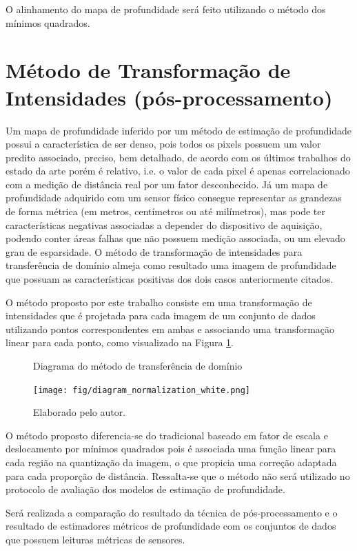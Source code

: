 O alinhamento do mapa de profundidade será feito utilizando o método dos mínimos quadrados.


\section{Método de Transformação de Intensidades (pós-processamento)}

Um mapa de profundidade inferido por um método de estimação de profundidade possui a característica de ser denso, pois todos os pixels possuem um valor predito associado, preciso, bem detalhado, de acordo com os últimos trabalhos do estado da arte porém é relativo, i.e. o valor de cada pixel é apenas correlacionado com a medição de distância real por um fator desconhecido. Já um mapa de profundidade adquirido com um sensor físico consegue representar as grandezas de forma métrica (em metros, centímetros ou até milímetros), mas pode ter características negativas associadas a depender do dispositivo de aquisição, podendo conter áreas falhas que não possuem medição associada, ou um elevado grau de esparsidade. O método de transformação de intensidades para transferência de domínio almeja como resultado uma imagem de profundidade que possuam as características positivas dos dois casos anteriormente citados. 

O método proposto por este trabalho consiste em uma transformação de intensidades que é projetada para cada imagem de um conjunto de dados utilizando pontos correspondentes em ambas e associando uma transformação linear para cada ponto, como visualizado na Figura \ref{posproc}. 


\begin{figure}[h]
    \centering
    \caption{Diagrama do método de transferência de domínio}
    \texttt{[image: fig/diagram\_normalization\_white.png]}
    \caption*{Elaborado pelo autor.}
    \label{posproc}
\end{figure}

O método proposto diferencia-se do tradicional baseado em fator de escala e deslocamento por mínimos quadrados pois é associada uma função linear para cada região na quantização da imagem, o que propicia uma correção adaptada para cada proporção de distância. Ressalta-se que o método não será utilizado no protocolo de avaliação dos modelos de estimação de profundidade.

Será realizada a comparação do resultado da técnica de pós-processamento e o resultado de estimadores métricos de profundidade com os conjuntos de dados que possuem leituras métricas de sensores.


